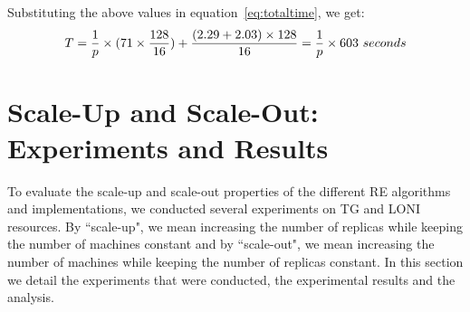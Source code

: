 \documentclass{rspublic}
\newcommand{\jhanote}[1]{ {\textcolor{red} { ***shantenu: #1 }}}
\newcommand{\alnote}[1]{ {\textcolor{blue} { ***andre: #1 }}}
\newcommand{\alnote}[1]{}
\newcommand{\jhanote}[1]{}
\begin{document}
{Substituting the above values in equation~\ref{eq:totaltime}, we get:
\begin{eqnarray}
T=  {1 \over p} \times {{(71\times {128\over 16}}) + {(2.29+2.03)\times 128\over 16}} = {1 \over p} \times 603~seconds
\label{eq:decent}
\end{eqnarray}





\section{Scale-Up and Scale-Out: Experiments and Results}
\label{sec:performance}

To evaluate the scale-up and scale-out properties of the different RE
algorithms and implementations, we conducted several experiments on TG
and LONI resources. By ``scale-up", we mean increasing the number of
replicas while keeping the number of machines constant and by
``scale-out", we mean increasing the number of machines while keeping
the number of replicas constant.  In this section we detail the
experiments that were conducted, the experimental results and the
analysis.

}
\end{document}
